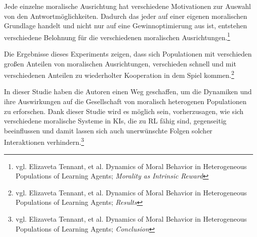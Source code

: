 Jede einzelne moralische Ausrichtung hat verschiedene Motivationen zur Auswahl von den Antwortmöglichkeiten.
Dadurch das jeder auf einer eigenen moralischen Grundlage handelt und nicht nur auf eine Gewinnoptimierung aus ist,
entstehen verschiedene Belohnung für die verschiedenen moralischen Ausrichtungen.\footnote{vgl. Elizaveta Tennant, et al. Dynamics of Moral Behavior in Heterogeneous Populations of Learning Agents; \textit{Morality as Intrinsic Reward}}

Die Ergebnisse dieses Experiments zeigen, dass sich Populationen mit verschieden großen Anteilen von moralischen Ausrichtungen,
verschieden schnell und mit verschiedenen Anteilen zu wiederholter Kooperation in dem Spiel kommen.\footnote{vgl. Elizaveta Tennant, et al. Dynamics of Moral Behavior in Heterogeneous Populations of Learning Agents; \textit{Results}}

In dieser Studie haben die Autoren einen Weg geschaffen, um die Dynamiken und ihre Auswirkungen auf die Gesellschaft von moralisch heterogenen Populationen
zu erforschen.
Dank dieser Studie wird es möglich sein, vorherzusagen, wie sich verschiedene moralische Systeme in KIs, die zu RL fähig sind, gegenseitig
beeinflussen und damit lassen sich auch unerwünschte Folgen solcher Interaktionen verhindern.\footnote{vgl. Elizaveta Tennant, et al. Dynamics of Moral Behavior in Heterogeneous Populations of Learning Agents; \textit{Conclusion}} 

